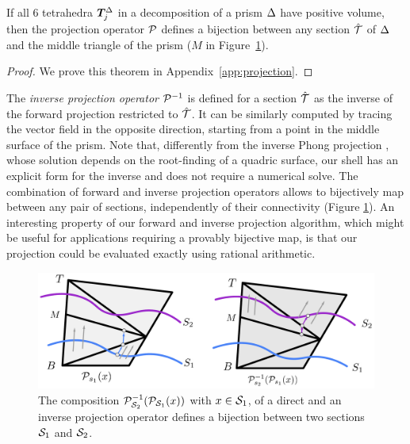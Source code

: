  

\begin{theorem}
If all  6 tetrahedra $\Tet_j^{\Prism}$ in a decomposition of a prism $\Prism$ have positive volume,
then the projection operator $\P$ defines a bijection between any section $\hat{\T}$ of $\Prism$ and the middle triangle of the prism ($M$ in Figure~\ref{prism:fig:projection_sections}).
\label{thm:projection}
\end{theorem}
\begin{proof}
We prove this theorem in Appendix~\ref{app:projection}.
\end{proof}

The \emph{inverse projection operator} $\P^{-1}$ is defined for a section $\hat{\T}$ as the inverse of the forward projection
restricted to $\hat{\T}$. %
It can be similarly computed by tracing the vector field in the opposite direction, starting from a point in the middle surface of the prism. Note that, differently from the inverse Phong projection \cite{panozzo2013weighted, kobbelt1998interactive}, whose solution depends on the root-finding of a quadric surface, our shell has an explicit form for the inverse and does not require a numerical solve. The combination of forward and inverse projection operators allows to bijectively map between any pair of sections, independently of their connectivity (Figure \ref{prism:fig:projection_sections}). An interesting property of our forward and inverse projection algorithm, which might be useful for applications requiring a provably bijective map, is that our projection could be evaluated exactly using rational arithmetic.


\begin{figure}
    \includegraphics[width=\linewidth]{prism-tex/figs/composition}
    \caption{The composition $\P^{-1}_{\S_2}(\P_{\S_1}(x))$ with $x \in \S_1$, of a direct and an inverse projection operator defines a bijection between two sections $\S_1$ and $\S_2$.}
    \label{prism:fig:projection_sections}
    
\end{figure}

